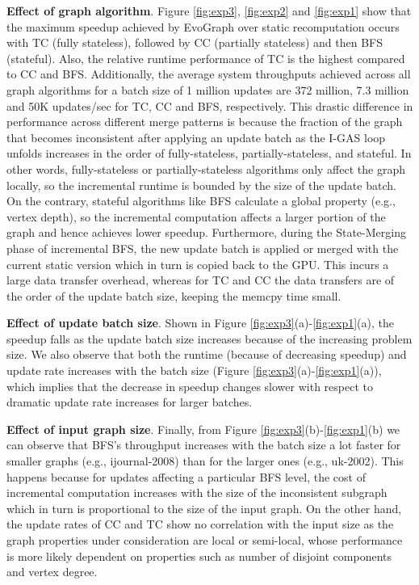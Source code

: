 \textbf{Effect of graph algorithm}. Figure \ref{fig:exp3}, \ref{fig:exp2} and  \ref{fig:exp1} show that the maximum speedup achieved by EvoGraph over static recomputation occurs with TC (fully stateless), followed by CC (partially stateless) and then BFS (stateful). Also, the relative runtime performance of TC is the highest compared to CC and BFS. Additionally, the average system throughputs achieved across all graph algorithms for a batch size of 1 million updates are 372 million, 7.3 million and 50K updates/sec for TC, CC and BFS, respectively. This drastic difference in performance across different merge patterns is because the fraction of the graph that becomes inconsistent after applying an update batch as the I-GAS loop unfolds increases in the order of fully-stateless, partially-stateless, and stateful. In other words, fully-stateless or partially-stateless algorithms only affect the graph locally, so the incremental runtime is bounded by the size of the update batch. On the contrary, stateful algorithms like BFS calculate a global property (e.g., vertex depth), so the incremental computation affects a larger portion of the graph and hence achieves lower speedup.  Furthermore, during the State-Merging phase of incremental BFS, the new update batch is applied or merged with the current static version which in turn is copied back to the GPU. This incurs a large data transfer overhead, whereas for TC and CC the data transfers are of the order of the update batch size, keeping the memcpy time small. 

\textbf{Effect of update batch size}. Shown in Figure \ref{fig:exp3}(a)-\ref{fig:exp1}(a), the speedup falls as the update batch size increases because of the increasing problem size. We also observe that both the runtime (because of decreasing speedup) and update rate increases with the batch size (Figure \ref{fig:exp3}(a)-\ref{fig:exp1}(a)), which implies that the decrease in speedup changes slower with respect to dramatic update rate increases for larger batches.


\textbf{Effect of input graph size}. Finally, from Figure \ref{fig:exp3}(b)-\ref{fig:exp1}(b)  we can observe that BFS's throughput increases with the batch size a lot faster for smaller graphs (e.g., ijournal-2008) than for the larger ones (e.g., uk-2002). This happens because for updates affecting a particular BFS level, the cost of incremental computation increases with the size of the inconsistent subgraph which in turn is proportional to the size of the input graph. On the other hand, the update rates of CC and TC show no correlation with the input size as the graph properties under consideration are local or semi-local, whose performance is more likely dependent on properties such as number of disjoint components and vertex degree.


